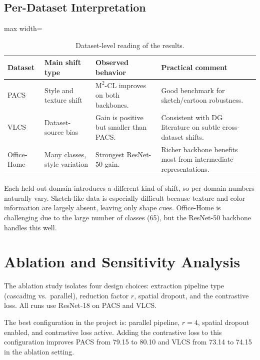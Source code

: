 \documentclass[11pt,a4paper]{article}
\newcommand{\method}{\texorpdfstring{$\mathrm{M}^2$\textup{-CL}}{M2-CL}}
\begin{document}
\subsection{Per-Dataset Interpretation}

\begin{table}[H]
\centering
\caption{Dataset-level reading of the results.}
\label{tab:dataset_reading}
\small
\begin{adjustbox}{max width=\textwidth}
\begin{tabular}{llll}
\toprule
\rowcolor{headerblue}
Dataset     & Main shift type           & Observed behavior & Practical comment \\
\midrule
PACS        & Style and texture shift   & \method{} improves on both backbones. & Good benchmark for sketch/cartoon robustness. \\
VLCS        & Dataset-source bias       & Gain is positive but smaller than PACS. & Consistent with DG literature on subtle cross-dataset shifts. \\
Office-Home & Many classes, style variation & Strongest ResNet-50 gain. & Richer backbone benefits most from intermediate representations. \\
\bottomrule
\end{tabular}
\end{adjustbox}
\end{table}

Each held-out domain introduces a different kind of shift, so per-domain numbers
naturally vary.  Sketch-like data is especially difficult because texture and
color information are largely absent, leaving only shape cues.  Office-Home is
challenging due to the large number of classes (65), but the ResNet-50 backbone
handles this well.

\section{Ablation and Sensitivity Analysis}
\label{sec:ablation}

The ablation study isolates four design choices: extraction pipeline type
(cascading vs.\ parallel), reduction factor $r$, spatial dropout, and the
contrastive loss.  All runs use ResNet-18 on PACS and VLCS.

The best configuration in the project is: parallel pipeline, $r=4$, spatial
dropout enabled, and contrastive loss active.  Adding the contrastive loss to this
configuration improves PACS from 79.15 to 80.10 and VLCS from 73.14 to 74.15
in the ablation setting.
\end{document}
